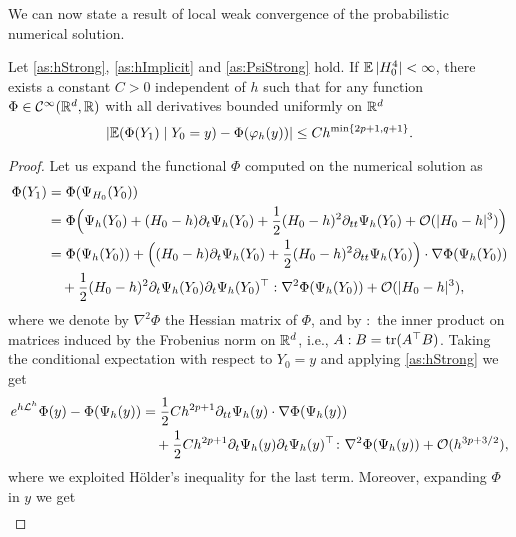 \documentclass[10pt]{article}
\begin{document}
We can now state a result of local weak convergence of the probabilistic numerical solution.
\begin{lemma}\label{thm:WeakLocalOrder} Let \cref{as:hStrong}, \cref{as:hImplicit} and \cref{as:PsiStrong} hold. If $\operatorname{\mathbb{E}}|H_0^4| < \infty$, there exists a constant $C > 0$ independent of $h$ such that for any function $\Phi\in \mathcal{C}^{\infty}(\mathbb{R}^d,\mathbb{R})$ with all derivatives bounded uniformly on $\mathbb{R}^d$
	\begin{equation}
		\lvert\operatorname{\mathbb{E}}(\Phi(Y_1)\mid Y_0 = y) - \Phi(\varphi_h(y))\rvert \leq C h^{\min\{2p+1, q+1\}}.
	\end{equation}
\end{lemma}
\begin{proof} Let us expand the functional $\Phi$ computed on the numerical solution as
	\begin{equation}
		\begin{aligned}
			\Phi(Y_1) &= \Phi(\Psi_{H_0}(Y_0)) \\
			&= \Phi\Big(\Psi_h(Y_0) + (H_0-h)\partial_t\Psi_h(Y_0) + \frac{1}{2}(H_0-h)^2\partial_{tt}\Psi_h(Y_0) + \mathcal{O}(\lvert H_0 - h\rvert^3)\Big)\\
			&= \Phi(\Psi_h(Y_0)) + \Big((H_0 - h)\partial_t\Psi_h(Y_0)+\frac{1}{2}(H_0-h)^2\partial_{tt}\Psi_h(Y_0)\Big) \cdot \nabla\Phi(\Psi_h(Y_0))\\
			&\quad + \frac{1}{2}(H_0 - h)^2 \partial_t \Psi_h(Y_0) \partial_t \Psi_h(Y_0)^\top : \nabla^2\Phi(\Psi_h(Y_0)) + \mathcal{O}(\lvert H_0 - h\rvert^3),
		\end{aligned}
	\end{equation}
	where we denote by $\nabla^2\Phi$ the Hessian matrix of $\Phi$, and by $:$ the inner product on matrices induced by the Frobenius norm on $\mathbb{R}^d$, i.e., $A : B = \operatorname{tr}(A^\top B)$. Taking the conditional expectation with respect to $Y_0 = y$ and applying \cref{as:hStrong} we get
	\begin{equation}
		\begin{aligned}
			e^{h\mathcal{L}^h}\Phi(y) - \Phi(\Psi_h(y)) &= \frac{1}{2} Ch^{2p+1}\partial_{tt}\Psi_h(y)\cdot \nabla\Phi(\Psi_h(y))\\
			&\quad + \frac{1}{2} Ch^{2p+1}\partial_t \Psi_h(y) \partial_t \Psi_h(y)^\top  \colon \nabla^2\Phi(\Psi_h(y)) + \mathcal{O}(h^{3p+3/2}),
		\end{aligned}
	\end{equation}
	where we exploited Hölder's inequality for the last term. Moreover, expanding $\Phi$ in $y$ we get
	\begin{equation}
		\begin{aligned}

\end{aligned}
\end{equation}
\end{proof}
\end{document}
